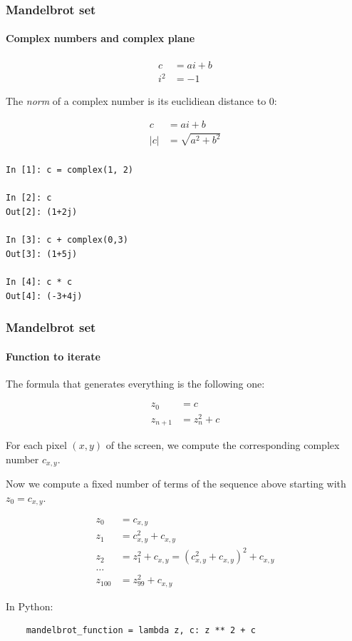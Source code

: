 \documentclass[9pt]{beamer}
\begin{document}
\begin{frame}[fragile]
  \frametitle{Mandelbrot set}

  \framesubtitle{Complex numbers and complex plane}

  \begin{align*}
    c &= ai + b\\
    i^{2} &= -1
  \end{align*}

  The \emph{norm} of a complex number is its euclidiean distance to 0:

  \begin{align*}
    c &= ai + b \\
    |c| &= \sqrt{a^{2}+b^{2}} \\
  \end{align*}

  \begin{verbatim}
In [1]: c = complex(1, 2)

In [2]: c
Out[2]: (1+2j)

In [3]: c + complex(0,3)
Out[3]: (1+5j)

In [4]: c * c
Out[4]: (-3+4j)
  \end{verbatim}

\end{frame}

\begin{frame}[fragile]
  \frametitle{Mandelbrot set}

  \framesubtitle{Function to iterate}

  The formula that generates everything is the following one:

  \begin{align*}
    z_{0} &= c \\
    z_{n + 1} &= z_{n}^{2} + c
  \end{align*}

  For each pixel $(x, y)$ of the screen, we compute the corresponding
  complex number $c_{x,y}$.

  \bigskip

  Now we compute a fixed number of terms of the sequence above
  starting with $z_{0} = c_{x,y}$.

  \begin{align*}
    z_{0} &= c_{x, y} \\
    z_{1} &= c_{x, y}^{2} + c_{x, y} \\
    z_{2} &= z_{1}^{2} + c_{x, y} = (c_{x, y}^{2} + c_{x, y})^{2} + c_{x, y} \\
    \dots \\
    z_{100} &= z_{99}^{2} + c_{x, y}
  \end{align*}

  In Python:

  \begin{lstlisting}
    mandelbrot_function = lambda z, c: z ** 2 + c
  \end{lstlisting}

\end{frame}
\end{document}
